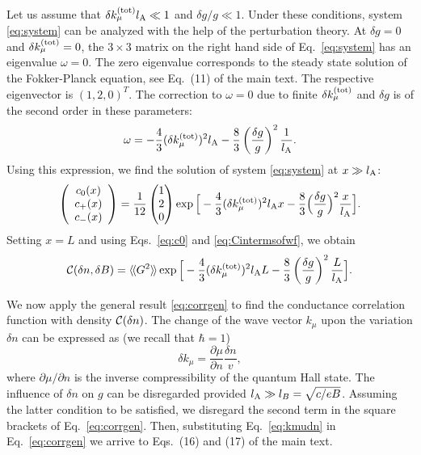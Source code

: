 \documentclass[pra,aps,a4paper,twocolumn,superscriptaddress,longbibliography]{revtex4-2}
\newcommand{\rngl}{\rangle\hspace{-0.05cm}\rangle}
\newcommand{\lngl}{\langle\hspace{-0.05cm}\langle}
\newcommand{\lprox}{L}
\newcommand{\lA}{l_{\rm A}}
\begin{document}
Let us assume that $\delta k_\mu^{(\rm tot)}\lA\ll 1$ and $\delta g / g \ll 1$. Under these conditions, system \eqref{eq:system} can be analyzed with the help of the perturbation theory. At $\delta g = 0$ and $\delta k_\mu^{(\rm tot)} = 0$, the $3\times 3$ matrix on the right hand side of  Eq.~\eqref{eq:system} has an eigenvalue $\omega = 0$. The zero eigenvalue corresponds to the steady state solution of the Fokker-Planck equation, see Eq.~(11) of the main text. The respective eigenvector is $(1, 2, 0)^T$.
The correction to $\omega = 0$ due to finite $\delta k_\mu^{\rm (tot)}$ and $\delta g$ is of the second order in these parameters:
\begin{equation}
    \omega = -\frac{4}{3} (\delta k_{\mu}^{(\rm tot)})^2 \lA - \frac{8}{3} \left(\frac{\delta g}{g}\right)^2 \frac{1}{\lA}.
\end{equation}
Using this expression, we find the solution of system \eqref{eq:system} at $x \gg \lA$:
\begin{equation}\label{eq:solforcs}
\left(\begin{array}{c}
c_0(x)\\
c_+(x)\\
c_-(x)
\end{array}\right)
=
\frac{1}{12} 
\begin{pmatrix}
1\\
2\\
0
\end{pmatrix}
\exp\Big[-\frac{4}{3} (\delta k_{\mu}^{(\rm tot)})^2 \lA x - \frac{8}{3} \Big(\frac{\delta g}{g}\Big)^2 \frac{x}{\lA}\Big].
\end{equation}
Setting $x = \lprox$ and using Eqs.~\eqref{eq:c0} and \eqref{eq:Cintermsofwf}, we obtain
\begin{equation}\label{eq:corrgen}
    {\cal C}(\delta n, \delta B) = \lngl G^2 \rngl \exp \Big[-\frac{4}{3} (\delta k_{\mu}^{(\rm tot)})^2 \lA \lprox -  \frac{8}{3} \left(\frac{\delta g}{g}\right)^2 \frac{\lprox}{\lA}\Big].
\end{equation}

We now apply the general result \eqref{eq:corrgen} to find the conductance correlation function with density ${\cal C}(\delta n)$. The change of the wave vector $k_\mu$ upon the variation $\delta n$ can be expressed as (we recall that $\hbar = 1$)
\begin{equation}\label{eq:kmudn}
    \delta k_\mu = \frac{\partial \mu}{\partial n} \frac{\delta n}{v},
\end{equation}
where $\partial \mu / \partial n$ is the inverse compressibility of the quantum Hall state.
The influence of $\delta n$ on $g$ can be disregarded provided $\lA \gg l_B = \sqrt{c / eB}$. Assuming the latter condition to be satisfied, we disregard the second term in the square brackets of Eq.~\eqref{eq:corrgen}. Then, substituting Eq.~\eqref{eq:kmudn} in Eq.~\eqref{eq:corrgen} we arrive to Eqs.~(16) and (17) of the main text.
\end{document}
